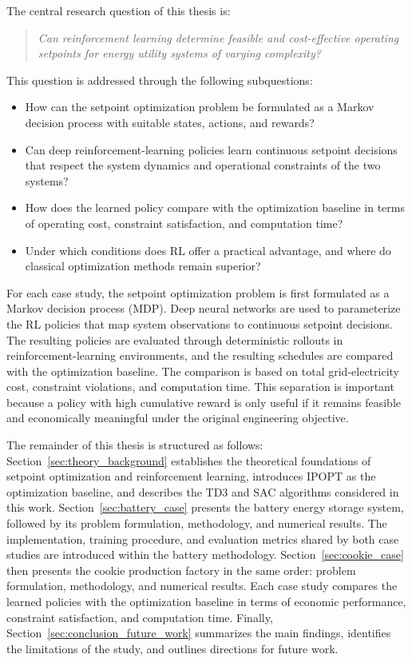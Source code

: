 \documentclass[12pt]{article}
\begin{document}
The central research question of this thesis is:
\begin{quote}
\itshape Can reinforcement learning determine feasible and cost-effective operating setpoints for energy utility systems of varying complexity?
\end{quote}
This question is addressed through the following subquestions:
\begin{itemize}
    \item How can the setpoint optimization problem be formulated as a Markov decision process with suitable states, actions, and rewards?
    \item Can deep reinforcement-learning policies learn continuous setpoint decisions that respect the system dynamics and operational constraints of the two systems?
    \item How does the learned policy compare with the optimization baseline in terms of operating cost, constraint satisfaction, and computation time?
    \item Under which conditions does RL offer a practical advantage, and where do classical optimization methods remain superior?
\end{itemize}

For each case study, the setpoint optimization problem is first formulated as a Markov decision process (MDP). Deep neural networks are used to parameterize the RL policies that map system observations to continuous setpoint decisions. The resulting policies are evaluated through deterministic rollouts in reinforcement-learning environments, and the resulting schedules are compared with the optimization baseline. The comparison is based on total grid-electricity cost, constraint violations, and computation time. This separation is important because a policy with high cumulative reward is only useful if it remains feasible and economically meaningful under the original engineering objective.

The remainder of this thesis is structured as follows: Section~\ref{sec:theory_background} establishes the theoretical foundations of setpoint optimization and reinforcement learning, introduces IPOPT as the optimization baseline, and describes the TD3 and SAC algorithms considered in this work. Section~\ref{sec:battery_case} presents the battery energy storage system, followed by its problem formulation, methodology, and numerical results. The implementation, training procedure, and evaluation metrics shared by both case studies are introduced within the battery methodology. Section~\ref{sec:cookie_case} then presents the cookie production factory in the same order: problem formulation, methodology, and numerical results. Each case study compares the learned policies with the optimization baseline in terms of economic performance, constraint satisfaction, and computation time. Finally, Section~\ref{sec:conclusion_future_work} summarizes the main findings, identifies the limitations of the study, and outlines directions for future work.
\end{document}

